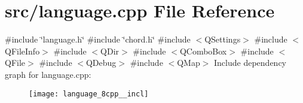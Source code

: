 \section{src/language.cpp File Reference}
\label{language_8cpp}
{\ttfamily \#include \char`\"{}language.\+h\char`\"{}}\newline
{\ttfamily \#include \char`\"{}chord.\+h\char`\"{}}\newline
{\ttfamily \#include $<$Q\+Settings$>$}\newline
{\ttfamily \#include $<$Q\+File\+Info$>$}\newline
{\ttfamily \#include $<$Q\+Dir$>$}\newline
{\ttfamily \#include $<$Q\+Combo\+Box$>$}\newline
{\ttfamily \#include $<$Q\+File$>$}\newline
{\ttfamily \#include $<$Q\+Debug$>$}\newline
{\ttfamily \#include $<$Q\+Map$>$}\newline
Include dependency graph for language.\+cpp\+:\nopagebreak
\begin{figure}[H]
\begin{center}
\leavevmode
\texttt{[image: language\_8cpp\_\_incl]}
\end{center}
\end{figure}
